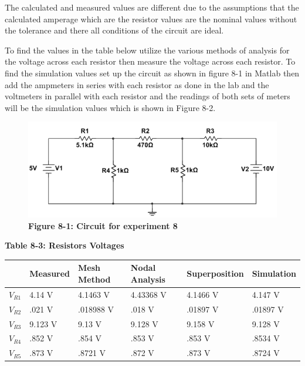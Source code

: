 \documentclass[a4paper]{article}
\begin{document}
The calculated and measured values are different due to the assumptions that the calculated amperage which are the resistor values are the nominal values without the 
tolerance and there all conditions of the circuit are ideal.

To find the values in the table below utilize the various methods of analysis for the voltage across each resistor then measure the voltage across each resistor. To find the 
simulation values set up the circuit as shown in figure 8-1 in Matlab then add the ampmeters in series with each resistor as done in the lab and the voltmeters 
in parallel with each resistor and the readings of both sets of meters will be the simulation values which is shown in Figure 8-2.
\vspace{.5 cm}
\begin{center}
    \begin{figure}[H]\label{fig8-2}
        \begin{center}
            \includegraphics[width = 16 cm]{fig8-1}\\
            \small\textbf{Figure 8-1: Circuit for experiment 8}\\    
        \end{center}
    \end{figure}
\end{center}

\begin{center}
    \small\textbf{Table 8-3: Resistors Voltages}
    \begin{tabular}{|p{2 cm}|p{2cm}|p{2 cm}|p{2 cm}|p{2 cm}|p{2 cm}|}
        \hline
         & Measured & Mesh Method & Nodal Analysis & Superposition & Simulation \\
        \hline
        $V_{R1}$ & 4.14 V & 4.1463 V & 4.43368 V & 4.1466 V & 4.147 V \\
        \hline
        $V_{R2}$ & .021 V & .018988 V & .018 V & .01897 V & .01897 V \\
        \hline
        $V_{R3}$ & 9.123 V & 9.13 V & 9.128 V & 9.158 V & 9.128 V \\
        \hline
        $V_{R4}$ & .852 V & .854 V & .853 V & .853 V & .8534 V \\
        \hline
        $V_{R5}$ & .873 V & .8721 V & .872 V & .873 V & .8724 V \\
        \hline
    \end{tabular}
\end{center}
\end{document}
